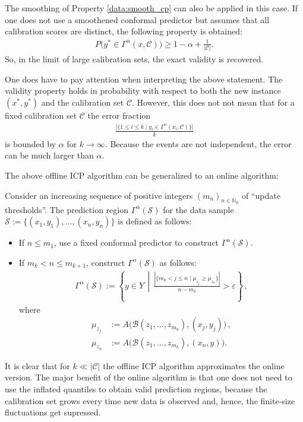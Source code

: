 \begin{property}[Validity]
        The smoothing of Property \ref{data:smooth_cp} can also be applied in this case. If one does not use a smoothened conformal predictor but assumes that all calibration scores are distinct, the following property is obtained:
        \begin{gather}
            P\big(y^*\in\Gamma^\alpha(x,\mathcal{C})\big)\geq 1 - \alpha + \frac{1}{|\mathcal{C}|}.
        \end{gather}
        So, in the limit of large calibration sets, the exact validity is recovered.
    \end{property}
    \begin{remark}
        One does have to pay attention when interpreting the above statement. The validity property holds in probability with respect to both the new instance $(x^*,y^*)$ and the calibration set $\mathcal{C}$. However, this does not not mean that for a fixed calibration set $\mathcal{C}$ the error fraction
        \begin{gather}
            \frac{|\{1\leq i\leq k\mid y_i\in\Gamma^\alpha(x_i,\mathcal{C})\}|}{k}
        \end{gather}
        is bounded by $\alpha$ for $k\longrightarrow\infty$. Because the events are not independent, the error can be much larger than $\alpha$.
    \end{remark}

    The above offline ICP algorithm can be generalized to an online algorithm:
    \begin{construct}
        Consider an increasing sequence of positive integers $(m_n)_{n\in\mathbb{N}_0}$ of ``update thresholds''. The prediction region $\Gamma^\alpha(\mathcal{S})$ for the data sample $\mathcal{S}:=\{(x_1,y_1),\ldots,(x_n,y_n)\}$ is defined as follows:
        \begin{itemize}
            \item If $n\leq m_1$, use a fixed conformal predictor to construct $\Gamma^\alpha(\mathcal{S})$.
            \item If $m_k<n\leq m_{k+1}$, construct $\Gamma^\alpha(\mathcal{S})$ as follows:
            \begin{gather}
                \Gamma^\alpha(\mathcal{S}) := \left\{y\in Y\,\middle\vert\,\frac{|\{m_k<j\leq n\mid\mu_{z_j}\geq\mu_{z_n}\}|}{n-m_k}>\varepsilon\right\}\,,
            \end{gather}
            where
            \begin{align*}
                \mu_{z_j} &:= A\big(\mathcal{B}(z_1,\ldots,z_{m_k}),(x_j,y_j)\big)\,,\\
                \mu_{z_n} &:= A\big(\mathcal{B}(z_1,\ldots,z_{m_k}),(x_n,y)\big).
            \end{align*}
        \end{itemize}
        It is clear that for $k\ll|\mathcal{C}|$ the offline ICP algorithm approximates the online version. The major benefit of the online algorithm is that one does not need to use the inflated quantiles to obtain valid prediction regions, because the calibration set grows every time new data is observed and, hence, the finite-size fluctuations get supressed.
    \end{construct}

